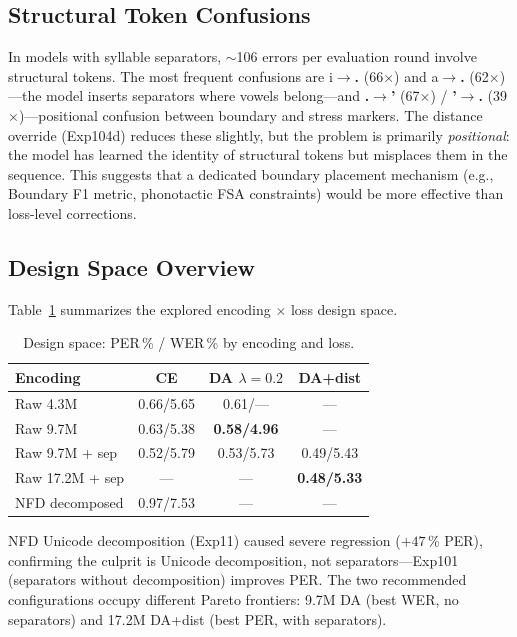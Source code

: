 \documentclass[conference]{IEEEtran}
\newcommand{\lam}{\lambda}                %
\begin{document}
\subsection{Structural Token Confusions}

In models with syllable separators, $\sim$106 errors per evaluation
round involve structural tokens.
The most frequent confusions are i$\to$\textbf{.} (66$\times$) and
a$\to$\textbf{.} (62$\times$)---the model inserts separators where
vowels belong---and \textbf{.}$\to$\textbf{'} (67$\times$) /
\textbf{'}$\to$\textbf{.} (39$\times$)---positional confusion
between boundary and stress markers.
The distance override (Exp104d) reduces these slightly, but the
problem is primarily \emph{positional}: the model has learned the
identity of structural tokens but misplaces them in the sequence.
This suggests that a dedicated boundary placement mechanism
(e.g., Boundary F1 metric, phonotactic FSA constraints) would be
more effective than loss-level corrections.

\subsection{Design Space Overview}

Table~\ref{tab:designspace} summarizes the explored encoding $\times$
loss design space.

\begin{table}[t]
  \caption{Design space: PER\,\% / WER\,\% by encoding and loss.}
  \label{tab:designspace}
  \centering\small
  \begin{tabular}{lccc}
    \toprule
    Encoding & CE & DA $\lam\!=\!0.2$ & DA+dist \\
    \midrule
    Raw 4.3M        & 0.66/5.65 & 0.61/--- & --- \\
    Raw 9.7M        & 0.63/5.38 & \textbf{0.58/4.96} & --- \\
    Raw 9.7M + sep  & 0.52/5.79 & 0.53/5.73 & 0.49/5.43 \\
    Raw 17.2M + sep & ---       & ---       & \textbf{0.48/5.33} \\
    NFD decomposed  & 0.97/7.53 & ---       & --- \\
    \bottomrule
  \end{tabular}
\end{table}

NFD Unicode decomposition (Exp11) caused severe regression
($+47$\,\% PER), confirming the culprit is Unicode decomposition,
not separators---Exp101 (separators without decomposition) improves
PER.
The two recommended configurations occupy different Pareto
frontiers: 9.7M DA (best WER, no separators) and 17.2M DA+dist
(best PER, with separators).
\end{document}
